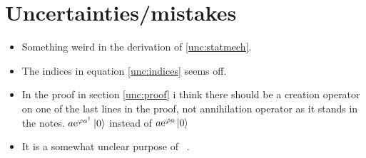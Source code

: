 \section{Uncertainties/mistakes}

\begin{itemize}
\item Something weird in the derivation of \eqref{unc:statmech}.
\item The indices in equation \eqref{unc:indices} seems off.  
\item In the proof in section \ref{unc:proof} i think there should be a creation operator on one of the last lines in the proof, not annihilation operator as it stands in the notes. $a\mathrm{e}^{\varphi a^\dagger}\ket{0}$ instead of $a\mathrm{e}^{\varphi a}\ket{0}$
\item It is a somewhat unclear purpose of ~. 

\end{itemize}